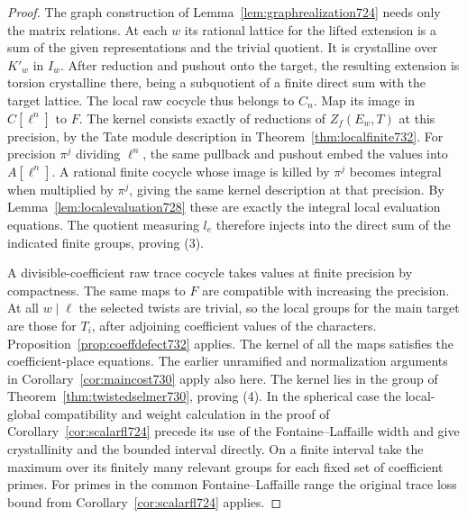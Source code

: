 \documentclass[a4paper,11pt]{article}
\theoremstyle{definition}
\theoremstyle{remark}
\numberwithin{equation}{section}
\begin{document}
\begin{proof}
The graph construction of Lemma~\ref{lem:graphrealization724} needs
only the matrix relations. At each \(w\) its rational lattice for
the lifted extension is a sum of the given representations and
the trivial quotient. It is crystalline over \(K'_w\) in \(I_w\).
After reduction and pushout onto the target, the resulting
extension is torsion crystalline there, being a subquotient of a
finite direct sum with the target lattice. The local raw cocycle
thus belongs to \(C_n\). Map its image in \(C[\ell^n]\) to \(F\).
The kernel consists exactly of reductions of \(Z_f(E_w,T)\) at
this precision, by the Tate module description in
Theorem~\ref{thm:localfinite732}. For precision \(\pi^j\) dividing
\(\ell^n\), the same pullback and pushout embed the values into
\(A[\ell^n]\). A rational finite cocycle whose image is killed by
\(\pi^j\) becomes integral when multiplied by \(\pi^j\), giving the
same kernel description at that precision. By Lemma~\ref{lem:localevaluation728}
these are exactly the integral local evaluation equations.
The quotient measuring \(l_e\) therefore injects into the direct
sum of the indicated finite groups, proving (3).

A divisible-coefficient raw trace cocycle takes values at finite
precision by compactness. The same maps to \(F\) are compatible
with increasing the precision. At all \(w\mid\ell\) the selected
twists are trivial, so the local groups for the main target are
those for \(T_i\), after adjoining coefficient values of the
characters. Proposition~\ref{prop:coeffdefect732} applies.
The kernel of all the maps satisfies the coefficient-place
equations. The earlier unramified and normalization arguments in
Corollary~\ref{cor:maincost730} apply also here. The kernel lies
in the group of Theorem~\ref{thm:twistedselmer730}, proving (4).
In the spherical case the local-global compatibility and weight
calculation in the proof of Corollary~\ref{cor:scalarfl724}
precede its use of the Fontaine--Laffaille width and give
crystallinity and the bounded interval directly. On a finite
interval take the maximum over its finitely many relevant groups
for each fixed set of coefficient primes. For primes in the
common Fontaine--Laffaille range the original trace loss bound
from Corollary~\ref{cor:scalarfl724} applies.
\end{proof}
\end{document}
